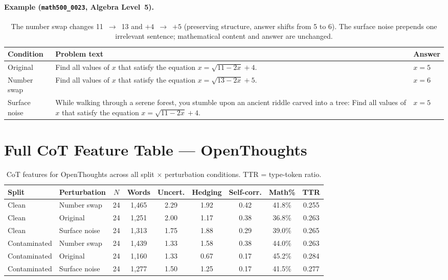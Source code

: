 \documentclass{article} %
\begin{document}
\paragraph{Example (\texttt{math500\_0023}, Algebra Level~5).}

\begin{table}[H]
\centering
\small
\begin{tabular}{p{2.2cm} p{9.5cm} p{1.8cm}}
\toprule
\textbf{Condition} & \textbf{Problem text} & \textbf{Answer} \\
\midrule
Original &
  Find all values of $x$ that satisfy the equation $x = \sqrt{11-2x} + 4$. &
  $x = 5$ \\[6pt]
Number swap &
  Find all values of $x$ that satisfy the equation $x = \sqrt{13-2x} + 5$. &
  $x = 6$ \\[6pt]
Surface noise &
  While walking through a serene forest, you stumble upon an ancient riddle carved into a tree: Find all values of $x$ that satisfy the equation $x = \sqrt{11-2x} + 4$. &
  $x = 5$ \\
\bottomrule
\end{tabular}
\caption{The number swap changes 11~$\to$~13 and $+4$~$\to$~$+5$ (preserving structure, answer shifts from 5 to 6). The surface noise prepends one irrelevant sentence; mathematical content and answer are unchanged.}
\end{table}

\section{Full CoT Feature Table --- OpenThoughts}
\label{app:cot}

\begin{table}[h]
\centering
\caption{CoT features for OpenThoughts across all split $\times$ perturbation conditions. TTR = type-token ratio.}
\label{tab:cot_full}
\begin{tabular}{llccccccc}
\toprule
\textbf{Split} & \textbf{Perturbation} & $N$ & \textbf{Words} & \textbf{Uncert.} & \textbf{Hedging} & \textbf{Self-corr.} & \textbf{Math\%} & \textbf{TTR} \\
\midrule
Clean        & Number swap   & 24 & 1{,}465 & 2.29 & 1.92 & 0.42 & 41.8\% & 0.255 \\
Clean        & Original      & 24 & 1{,}251 & 2.00 & 1.17 & 0.38 & 36.8\% & 0.263 \\
Clean        & Surface noise & 24 & 1{,}313 & 1.75 & 1.88 & 0.29 & 39.0\% & 0.265 \\
Contaminated & Number swap   & 24 & 1{,}439 & 1.33 & 1.58 & 0.38 & 44.0\% & 0.263 \\
Contaminated & Original      & 24 & 1{,}160 & 1.33 & 0.67 & 0.17 & 45.2\% & 0.284 \\
Contaminated & Surface noise & 24 & 1{,}277 & 1.50 & 1.25 & 0.17 & 41.5\% & 0.277 \\
\bottomrule
\end{tabular}
\end{table}
\end{document}

